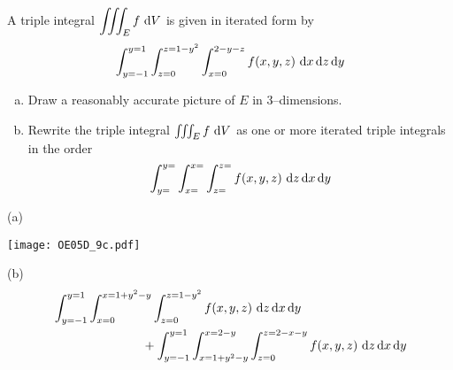\begin{question}[M200 2005D] %
A triple integral $\dst\tripInt_E f\ \dee{V}$ is given in 
iterated form by
\begin{equation*}
\int_{y=-1}^{y=1} \int_{z=0}^{z=1-y^2} \int_{x=0}^{2-y-z} f(x,y,z)
                                    \ \dee{x}\,\dee{z}\,\dee{y}
\end{equation*}
\begin{enumerate}[(a)]
\item
Draw a reasonably accurate picture of $E$ in 3--dimensions.
\item
Rewrite the triple integral $\iiint_E f\ \mathrm{d}V$ as one or more 
iterated triple integrals in the order
\begin{equation*}
\int_{y=}^{y=} \int_{x=}^{x=} \int_{z=}^{z=} f(x,y,z)
                                    \ \dee{z}\,\dee{x}\,\dee{y}
\end{equation*}
\end{enumerate}
\end{question}

%

\begin{answer}
(a)
\begin{center}
     \texttt{[image: OE05D\_9c.pdf]}
\end{center}

(b)
\begin{align*}
&\int_{y=-1}^{y=1} \int_{x=0}^{x=1+y^2-y} \int_{z=0}^{z=1-y^2} f(x,y,z)
                                    \ \mathrm{d}z\,\mathrm{d}x\,\mathrm{d}y \\
&\hskip1in
+\int_{y=-1}^{y=1} \int_{x=1+y^2-y}^{x=2-y} \int_{z=0}^{z=2-x-y} f(x,y,z)
                                    \ \mathrm{d}z\,\mathrm{d}x\,\mathrm{d}y
\end{align*}
\end{answer}

